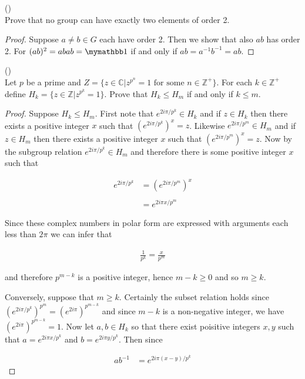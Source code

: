 \documentclass{exam}
\begin{document}
\begin{questions}
\vspace{1cm}

\question()\\
Prove that no group can have exactly two elements of order 2.

\begin{proof}
  Suppose $a\ne b\in G$ each have order 2.  Then we show that also $ab$ has order 2.  For $(ab)^2 = abab = \mymathbb 1$ if and only if $ab = a^{-1}b^{-1}=ab$.
\end{proof}

\vspace{1cm}

\question()\\
Let $p$ be a prime and $Z=\{z\in\mathbb C|z^{p^n}=1 \text{ for some } n\in\mathbb Z^+\}$.  For each $k\in\mathbb Z^+$ define $H_k=\{z\in\mathbb Z|z^{p^k}=1\}$.  Prove that $H_k\leq H_m$ if and only if $k\leq m$.

\begin{proof}
  Suppose $H_k\leq H_m$.  First note that $e^{2i\pi/p^k}\in H_k$ and if $z\in H_k$ then there exists a positive integer $x$ such that $(e^{2i\pi/p^k})^x=z$. Likewise $e^{2i\pi/p^m}\in H_m$ and if $z\in H_m$ then there exists a positive integer $x$ such that $(e^{2i\pi/p^m})^x=z$.  Now by the subgroup relation $e^{2i\pi/p^k}\in H_m$ and therefore there is some positive integer $x$ such that

  \begin{align*}
    e^{2i\pi/p^k} &= (e^{2i\pi/p^m})^x \\\\
    &= e^{2i\pi x/p^m}
  \end{align*}

  Since these complex numbers in polar form are expressed with arguments each less than $2\pi$ we can infer that

  \begin{align*}
    \frac{1}{p^k} = \frac{x}{p^m}
  \end{align*}

  and therefore $p^{m-k}$ is a positive integer, hence $m-k\geq 0$ and so $m\geq k$.

  Conversely, suppose that $m\geq k$.  Certainly the subset relation holds since $(e^{2i\pi/p^k})^{p^m}=(e^{2i\pi})^{p^{m-k}}$ and since $m-k$ is a non-negative integer, we have $(e^{2i\pi})^{p^{m-k}}=1$.  Now let $a,b\in H_k$ so that there exist poisitive integers $x,y$ such that $a=e^{2i\pi x/p^k}$ and $b=e^{2i\pi y/p^k}$.  Then since

  \begin{align*}
    ab^{-1} &= e^{2i\pi(x-y)/p^k}
  \end{align*}


\end{proof}
\end{questions}
\end{document}
